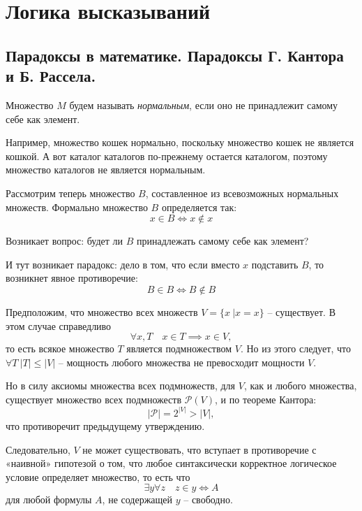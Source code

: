 \section{Логика высказываний}

\subsection{Парадоксы в математике. Парадоксы Г. Кантора и Б. Рассела.}

\begin{statement}[Рассел]
    Множество $M$ будем называть \emph{нормальным}, если оно не принадлежит самому себе как элемент.

    Например, множество кошек нормально, поскольку множество кошек не является кошкой. А вот каталог каталогов по-прежнему остается каталогом, поэтому множество каталогов не является нормальным.

    Рассмотрим теперь множество $B$, составленное из всевозможных нормальных множеств. Формально множество $B$ определяется так:
    \[
        x \in B \iff x \notin x
    \]

    Возникает вопрос: будет ли $B$ принадлежать самому себе как элемент?

    И тут возникает парадокс: дело в том, что если вместо $x$ подставить $B$, то возникнет явное противоречие:
    \[
        B \in B \iff B \notin B
    \]
\end{statement}

\begin{statement}[Кантор]
    Предположим, что множество всех множеств $V = \{x \ \big| x = x\}$ -- существует. В этом случае справедливо
    \[
        \forall x,T \quad x \in T \implies x \in V,
    \]
    то есть всякое множество $T$ является подмножеством $V$. Но из этого следует, что $\forall T \ |T| \leqslant |V|$ -- мощность любого множества не превосходит мощности $V$.

    Но в силу аксиомы множества всех подмножеств, для $V$, как и любого множества, существует множество всех подмножеств $\mathcal{P}(V)$, и по теореме Кантора:
    \[
        |\mathcal{P}| = 2^{|V|} > |V|,
    \]
    что противоречит предыдущему утверждению.

    Следовательно, $V$ не может существовать, что вступает в противоречие с «наивной» гипотезой о том, что
    любое синтаксически корректное логическое условие определяет множество, то есть что
    \[
        \exists y \forall z \quad z \in y \iff A
    \]
    для любой формулы $A$, не содержащей $y$ -- свободно.
\end{statement}

